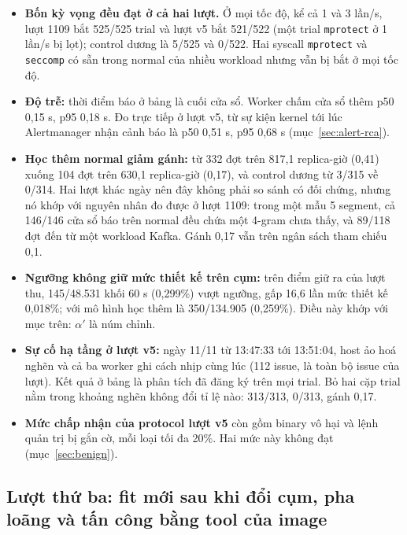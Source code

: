 \begin{itemize}
\tightlist
\item
  \textbf{Bốn kỳ vọng đều đạt ở cả hai lượt.} Ở mọi tốc độ, kể cả 1 và 3 lần/s, lượt 1109 bắt 525/525 trial và lượt v5 bắt 521/522 (một trial \texttt{mprotect} ở 1 lần/s bị lọt); control dương là 5/525 và 0/522. Hai syscall \texttt{mprotect} và \texttt{seccomp} có sẵn trong normal của nhiều workload nhưng vẫn bị bắt ở mọi tốc độ.
\item
  \textbf{Độ trễ:} thời điểm báo ở bảng là cuối cửa sổ. Worker chấm cửa sổ thêm p50 0,15 s, p95 0,18 s. Đo trực tiếp ở lượt v5, từ sự kiện kernel tới lúc Alertmanager nhận cảnh báo là p50 0,51 s, p95 0,68 s (mục~\ref{sec:alert-rca}).
\item
  \textbf{Học thêm normal giảm gánh:} từ 332 đợt trên 817,1 replica-giờ (0,41) xuống 104 đợt trên 630,1 replica-giờ (0,17), và control dương từ 3/315 về 0/314. Hai lượt khác ngày nên đây không phải so sánh có đối chứng, nhưng nó khớp với nguyên nhân đo được ở lượt 1109: trong một mẫu 5 segment, cả 146/146 cửa sổ báo trên normal đều chứa một 4-gram chưa thấy, và 89/118 đợt đến từ một workload Kafka. Gánh 0,17 vẫn trên ngân sách tham chiếu 0,1.
\item
  \textbf{Ngưỡng không giữ mức thiết kế trên cụm:} trên điểm giữ ra của lượt thu, 145/48.531 khối 60 s (0,299\%) vượt ngưỡng, gấp 16,6 lần mức thiết kế 0,018\%; với mô hình học thêm là 350/134.905 (0,259\%). Điều này khớp với mục trên: $\alpha'$ là núm chỉnh.
\item
  \textbf{Sự cố hạ tầng ở lượt v5:} ngày 11/11 từ 13:47:33 tới 13:51:04, host ảo hoá nghẽn và cả ba worker ghi cách nhịp cùng lúc (112 issue, là toàn bộ issue của lượt). Kết quả ở bảng là phân tích đã đăng ký trên mọi trial. Bỏ hai cặp trial nằm trong khoảng nghẽn không đổi tỉ lệ nào: 313/313, 0/313, gánh 0,17.
\item
  \textbf{Mức chấp nhận của protocol lượt v5} còn gồm binary vô hại và lệnh quản trị bị gắn cờ, mỗi loại tối đa 20\%. Hai mức này không đạt (mục~\ref{sec:benign}).
\end{itemize}

\subsection{Lượt thứ ba: fit mới sau khi đổi cụm, pha loãng và tấn công bằng tool của image}\label{sec:token-live-v6}

